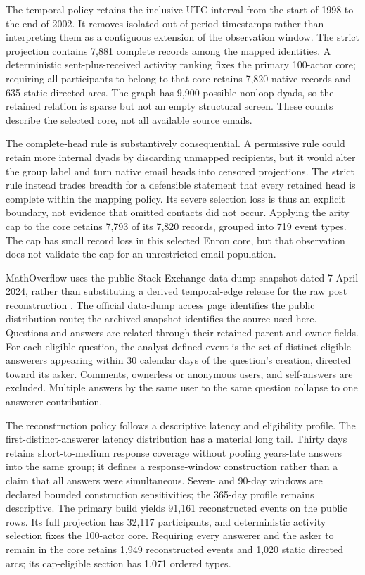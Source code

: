 \documentclass[10pt]{article}
\begin{document}
The temporal policy retains the inclusive UTC interval from the start of 1998 to the end of 2002. It removes isolated out-of-period timestamps rather than interpreting them as a contiguous extension of the observation window. The strict projection contains 7,881 complete records among the mapped identities. A deterministic sent-plus-received activity ranking fixes the primary 100-actor core; requiring all participants to belong to that core retains 7,820 native records and 635 static directed arcs. The graph has 9,900 possible nonloop dyads, so the retained relation is sparse but not an empty structural screen. These counts describe the selected core, not all available source emails.

The complete-head rule is substantively consequential. A permissive rule could retain more internal dyads by discarding unmapped recipients, but it would alter the group label and turn native email heads into censored projections. The strict rule instead trades breadth for a defensible statement that every retained head is complete within the mapping policy. Its severe selection loss is thus an explicit boundary, not evidence that omitted contacts did not occur. Applying the arity cap to the core retains 7,793 of its 7,820 records, grouped into 719 event types. The cap has small record loss in this selected Enron core, but that observation does not validate the cap for an unrestricted email population.

MathOverflow uses the public Stack Exchange data-dump snapshot dated 7 April 2024, rather than substituting a derived temporal-edge release for the raw post reconstruction \citep{mathoverflow2024}. The official data-dump access page identifies the public distribution route; the archived snapshot identifies the source used here. Questions and answers are related through their retained parent and owner fields. For each eligible question, the analyst-defined event is the set of distinct eligible answerers appearing within 30 calendar days of the question's creation, directed toward its asker. Comments, ownerless or anonymous users, and self-answers are excluded. Multiple answers by the same user to the same question collapse to one answerer contribution.

The reconstruction policy follows a descriptive latency and eligibility profile. The first-distinct-answerer latency distribution has a material long tail. Thirty days retains short-to-medium response coverage without pooling years-late answers into the same group; it defines a response-window construction rather than a claim that all answers were simultaneous. Seven- and 90-day windows are declared bounded construction sensitivities; the 365-day profile remains descriptive. The primary build yields 91,161 reconstructed events on the public rows. Its full projection has 32,117 participants, and deterministic activity selection fixes the 100-actor core. Requiring every answerer and the asker to remain in the core retains 1,949 reconstructed events and 1,020 static directed arcs; its cap-eligible section has 1,071 ordered types.
\end{document}
